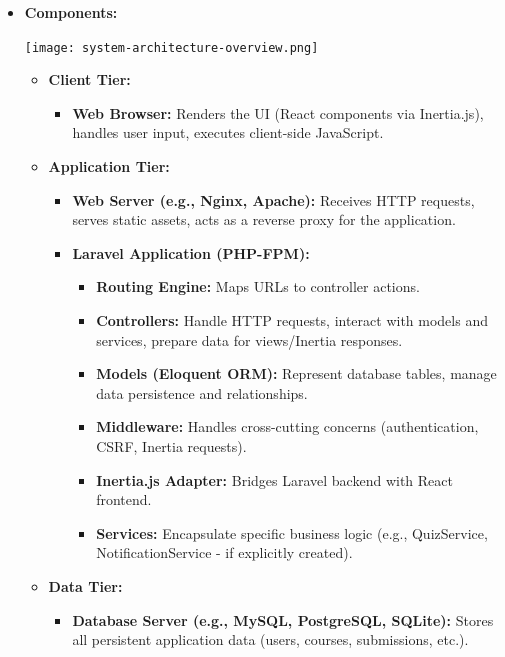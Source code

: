 \documentclass[12pt,a4paper]{article}
\begin{document}
\begin{itemize}
    \item \textbf{Components:}
        \begin{center}       
        \texttt{[image: system-architecture-overview.png]}
        \label{fig:system-architecture-overview}
        \end{center}
    \begin{itemize}
        \item \textbf{Client Tier:}
        \begin{itemize}
            \item \textbf{Web Browser:} Renders the UI (React components via Inertia.js), handles user input, executes client-side JavaScript.
        \end{itemize}
        \item \textbf{Application Tier:}
        \begin{itemize}
            \item \textbf{Web Server (e.g., Nginx, Apache):} Receives HTTP requests, serves static assets, acts as a reverse proxy for the application.
            \item \textbf{Laravel Application (PHP-FPM):}
            \begin{itemize}
                \item \textbf{Routing Engine:} Maps URLs to controller actions.
                \item \textbf{Controllers:} Handle HTTP requests, interact with models and services, prepare data for views/Inertia responses.
                \item \textbf{Models (Eloquent ORM):} Represent database tables, manage data persistence and relationships.
                \item \textbf{Middleware:} Handles cross-cutting concerns (authentication, CSRF, Inertia requests).
                \item \textbf{Inertia.js Adapter:} Bridges Laravel backend with React frontend.
                \item \textbf{Services:} Encapsulate specific business logic (e.g., QuizService, NotificationService - if explicitly created).
            \end{itemize}
        \end{itemize}
        \item \textbf{Data Tier:}
        \begin{itemize}
            \item \textbf{Database Server (e.g., MySQL, PostgreSQL, SQLite):} Stores all persistent application data (users, courses, submissions, etc.).

\end{itemize}
\end{itemize}
\end{itemize}
\end{document}
